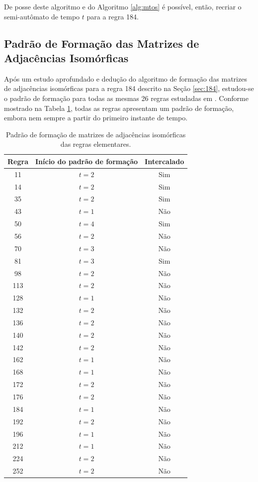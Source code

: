 \documentclass[12pt,a4paper]{article}
\begin{document}
De posse deste algoritmo e do Algoritmo \ref{alg:mtos} é possível, então,
recriar o semi-autômato de tempo $t$ para a regra 184.

\subsection{Padrão de Formação das Matrizes de Adjacências Isomórficas}

Após um estudo aprofundado e dedução do algoritmo de formação das matrizes
de adjacências isomórficas para a regra 184 descrito na Seção \ref{sec:184},
estudou-se o padrão de formação para todas as mesmas 26 regras estudadas em
. Conforme mostrado na Tabela \ref{tab:pattern},
todas as regras apresentam um padrão de formação, embora nem sempre a
partir do primeiro instante de tempo.

\begin{table}[htp]
\begin{center}
\begin{tabular}{|c|c|c|}
\hline
\textbf{Regra} & \textbf{Início do padrão de formação} & \textbf{Intercalado}\\ \hline
 11 & $t=2$ & Sim \\ \hline
 14 & $t=2$ & Sim \\ \hline
 35 & $t=2$ & Sim \\ \hline
 43 & $t=1$ & Não \\ \hline
 50 & $t=4$ & Sim \\ \hline
 56 & $t=2$ & Não \\ \hline
 70 & $t=3$ & Não \\ \hline
 81 & $t=3$ & Sim \\ \hline
 98 & $t=2$ & Não \\ \hline
113 & $t=2$ & Não \\ \hline
128 & $t=1$ & Não \\ \hline
132 & $t=2$ & Não \\ \hline
136 & $t=2$ & Não \\ \hline
140 & $t=2$ & Não \\ \hline
142 & $t=2$ & Não \\ \hline
162 & $t=1$ & Não \\ \hline
168 & $t=1$ & Não \\ \hline
172 & $t=2$ & Não \\ \hline
176 & $t=2$ & Não \\ \hline
184 & $t=1$ & Não \\ \hline
192 & $t=2$ & Não \\ \hline
196 & $t=1$ & Não \\ \hline
212 & $t=1$ & Não \\ \hline
224 & $t=2$ & Não \\ \hline
252 & $t=2$ & Não \\ \hline
\end{tabular}
\caption{Padrão de formação de matrizes de adjacências isomórficas das
regras elementares.}
\label{tab:pattern}
\end{center}
\end{table}
\end{document}
